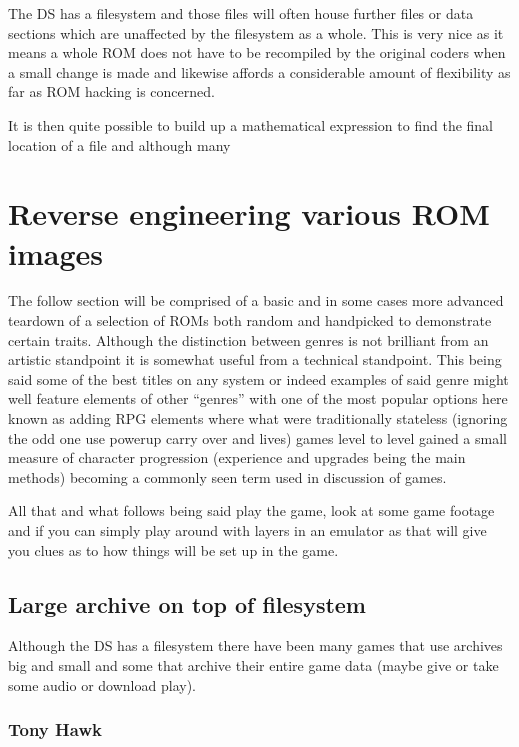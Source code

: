 \documentclass[
]{book}
\begin{document}
The DS has a filesystem and those files will often house further files or data sections which are unaffected by the filesystem as a whole. This is very nice as it means a whole ROM does not have to be recompiled by the original coders when a small change is made and likewise affords a considerable amount of flexibility as far as ROM hacking is concerned.

It is then quite possible to build up a mathematical expression to find the final location of a file and although many

\hypertarget{reverse-engineering-various-rom-images}{%
\chapter{Reverse engineering various ROM images}\label{reverse-engineering-various-rom-images}}

The follow section will be comprised of a basic and in some cases more advanced teardown of a selection of ROMs both random and handpicked to demonstrate certain traits. Although the distinction between genres is not brilliant from an artistic standpoint it is somewhat useful from a technical standpoint. This being said some of the best titles on any system or indeed examples of said genre might well feature elements of other ``genres'' with one of the most popular options here known as adding RPG elements where what were traditionally stateless (ignoring the odd one use powerup carry over and lives) games level to level gained a small measure of character progression (experience and upgrades being the main methods) becoming a commonly seen term used in discussion of games.

All that and what follows being said play the game, look at some game footage and if you can simply play around with layers in an emulator as that will give you clues as to how things will be set up in the game.

\hypertarget{large-archive-on-top-of-filesystem}{%
\section{Large archive on top of filesystem}\label{large-archive-on-top-of-filesystem}}

Although the DS has a filesystem there have been many games that use archives big and small and some that archive their entire game data (maybe give or take some audio or download play).

\hypertarget{tony-hawk}{%
\subsection{Tony Hawk}\label{tony-hawk}}
\end{document}
